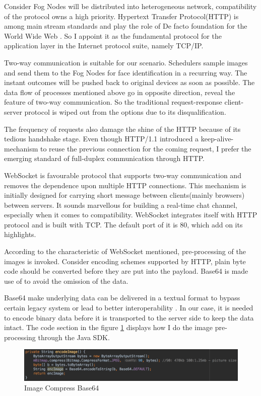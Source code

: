 Consider Fog Nodes will be distributed into heterogeneous network, compatibility of the protocol owns a high priority. Hypertext Transfer Protocol(HTTP) is among main stream standards and play the role of De facto foundation for the World Wide Web \cite{fielding1999hypertext}. So I appoint it as the fundamental protocol for the application layer in the Internet protocol suite, namely TCP/IP.

Two-way communication is suitable for our scenario. Schedulers sample images and send them to the Fog Nodes for face identification in a recurring way. The instant outcomes will be pushed back to original devices as soon as possible. The data flow of processes mentioned above go in opposite direction, reveal the feature of two-way communication. So the traditional request-response client-server protocol is wiped out from the options due to its disqualification.

The frequency of requests also damage the shine of the HTTP because of its tedious handshake stage. Even though HTTP/1.1 introduced a keep-alive-mechanism to reuse the previous connection for the coming request, I prefer the emerging standard of full-duplex communication through HTTP.

WebSocket is favourable protocol that supports two-way communication and removes the dependence upon multiple HTTP connections\cite{fette2011websocket}. This mechanism is initially designed for carrying short message between clients(mainly browsers) between servers. It sounds marvellous for building a real-time chat channel, especially when it comes to compatibility. WebSocket integrates itself with HTTP protocol and is built with TCP. The default port of it is 80, which add on its highlights.\cite{fette2011websocket}

According to the characteristic of WebSocket mentioned, pre-processing of the images is invoked. Consider encoding schemes supported by HTTP, plain byte code should be converted before they are put into the payload. Base64 is made use of to avoid the omission of the data.

Base64 make underlying data can be delivered in a textual format to bypass certain legacy system or lead to better interoperability \cite{josefsson2006base16}. In our case, it is needed to encode binary data before it is transported to the server side to keep the data intact. The code section in the figure \ref{fig:png_base64} displays how I do the image pre-processing through the Java SDK.

\begin{figure}
    \centering
    \includegraphics[width=\textwidth]{images/png&base64.png}
    \caption{Image Compress  Base64}
    \label{fig:png_base64}
\end{figure}




